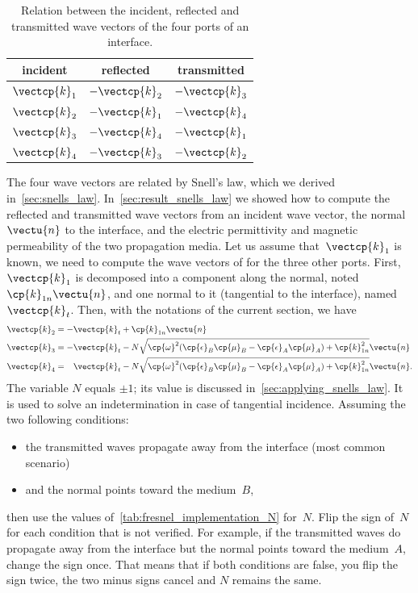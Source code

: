 \begin{table}[hbtp]
    \centering
    \begin{tabular}{ccc}
        \toprule
        incident & reflected & transmitted \\
        \midrule
        $\vectcp{k}_1$ & $-\vectcp{k}_2$ & $-\vectcp{k}_3$ \\
        $\vectcp{k}_2$ & $-\vectcp{k}_1$ & $-\vectcp{k}_4$ \\
        $\vectcp{k}_3$ & $-\vectcp{k}_4$ & $-\vectcp{k}_1$ \\
        $\vectcp{k}_4$ & $-\vectcp{k}_3$ & $-\vectcp{k}_2$ \\
        \bottomrule
    \end{tabular}
    \caption{Relation between the incident, reflected and transmitted wave vectors of the four ports of an interface.}
    \label{tab:inc_ref_tra}
\end{table}
The four wave vectors are related by Snell's law, which we derived in~\cref{sec:snells_law}.
In~\cref{sec:result_snells_law} we showed how to compute the reflected and transmitted wave vectors from an incident wave vector, the normal~$\vectu{n}$ to the interface, and the electric permittivity and magnetic permeability of the two propagation media.
Let us assume that~$\vectcp{k}_1$ is known, we need to compute the wave vectors of for the three other ports.
First, $\vectcp{k}_1$ is decomposed into a component along the normal, noted $\cp{k}_{1n}\vectu{n}$, and one normal to it (tangential to the interface), named $\vectcp{k}_t$.
Then, with the notations of the current section, we have
\begin{align}
    \vectcp{k}_2
    &=
    -\vectcp{k}_t
    +
    \cp{k}_{1n}
    \vectu{n}
    \\
    \vectcp{k}_3
    &=
    -\vectcp{k}_t
    -
    N%
    \sqrt{\cp{\omega}^2 (\cp{\epsilon}_B \cp{\mu}_B - \cp{\epsilon}_A \cp{\mu}_A) + \cp{k}_{1n}^2}
    \vectu{n}
    \\
    \vectcp{k}_4
    &=
    \phantom{\mathrel{-}}
    \vectcp{k}_t
    -
    N%
    \sqrt{\cp{\omega}^2 (\cp{\epsilon}_B \cp{\mu}_B - \cp{\epsilon}_A \cp{\mu}_A) + \cp{k}_{1n}^2}
    \vectu{n}
    \text{.}
\end{align}
The variable $N$ equals $\pm1$; its value is discussed in~\cref{sec:applying_snells_law}.
It is used to solve an indetermination in case of tangential incidence.
Assuming the two following conditions:
\begin{itemize}
    \item the transmitted waves propagate away from the interface (most common scenario)
    \item and the normal points toward the medium~$B$,
\end{itemize}
then use the values of~\cref{tab:fresnel_implementation_N} for~$N$.
Flip the sign of~$N$ for each condition that is not verified.
For example, if the transmitted waves do propagate away from the interface but the normal points toward the medium~$A$, change the sign once.
That means that if both conditions are false, you flip the sign twice, the two minus signs cancel and $N$ remains the same.

